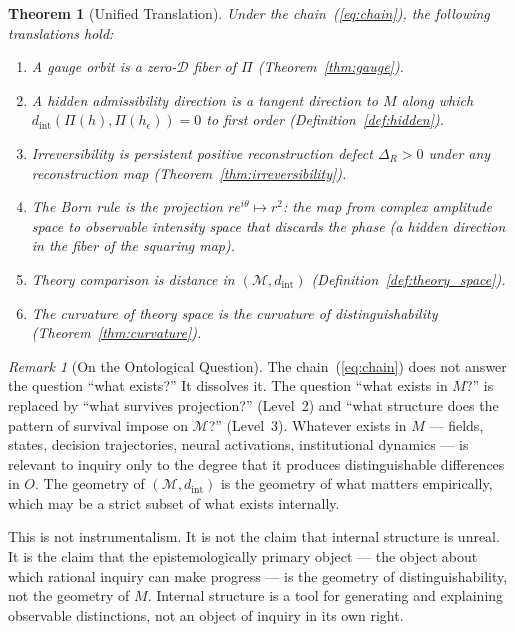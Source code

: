 \documentclass[12pt,a4paper]{article}
\newtheorem{theorem}{Theorem}[section]
\theoremstyle{remark}
\newtheorem{remark}{Remark}[section]
\theoremstyle{definition}
\begin{document}
\begin{theorem}[Unified Translation]
\label{thm:translation}
Under the chain~(\ref{eq:chain}), the following translations hold:
\begin{enumerate}[label=(\roman*)]
  \item A gauge orbit is a zero-$\mathcal{D}$ fiber of $\Pi$
        (Theorem~\ref{thm:gauge}).
  \item A hidden admissibility direction is a tangent direction to $M$
        along which $d_{\mathrm{int}}(\Pi(h), \Pi(h_\epsilon)) = 0$
        to first order (Definition~\ref{def:hidden}).
  \item Irreversibility is persistent positive reconstruction defect
        $\Delta_R > 0$ under any reconstruction map
        (Theorem~\ref{thm:irreversibility}).
  \item The Born rule is the projection $re^{i\theta} \mapsto r^2$:
        the map from complex amplitude space to observable intensity
        space that discards the phase (a hidden direction in the fiber
        of the squaring map).
  \item Theory comparison is distance in $(\mathcal{M}, d_{\mathrm{int}})$
        (Definition~\ref{def:theory_space}).
  \item The curvature of theory space is the curvature of
        distinguishability (Theorem~\ref{thm:curvature}).
\end{enumerate}
\end{theorem}

\begin{remark}[On the Ontological Question]
The chain~(\ref{eq:chain}) does not answer the question ``what exists?''
It dissolves it. The question ``what exists in $M$?'' is replaced by
``what survives projection?'' (Level~2) and ``what structure does the
pattern of survival impose on $\mathcal{M}$?'' (Level~3). Whatever exists
in $M$ --- fields, states, decision trajectories, neural activations,
institutional dynamics --- is relevant to inquiry only to the degree that
it produces distinguishable differences in $O$. The geometry of
$(\mathcal{M}, d_{\mathrm{int}})$ is the geometry of what matters
empirically, which may be a strict subset of what exists internally.

This is not instrumentalism. It is not the claim that internal structure
is unreal. It is the claim that the epistemologically primary object ---
the object about which rational inquiry can make progress --- is the
geometry of distinguishability, not the geometry of $M$. Internal
structure is a tool for generating and explaining observable distinctions,
not an object of inquiry in its own right.
\end{remark}
\end{document}
